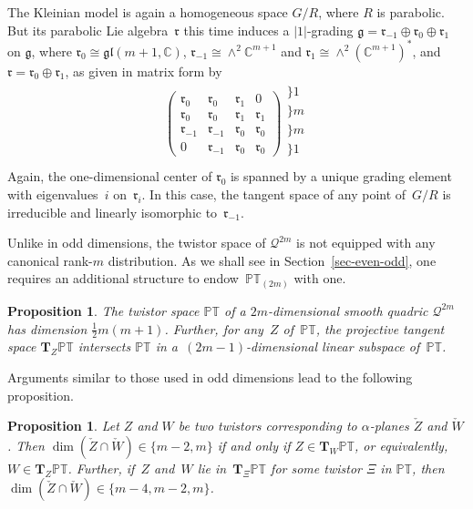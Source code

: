 \documentclass[10pt,a4paper]{amsart}
\numberwithin{equation}{section}
\newtheorem{Proposition}[Theorem]{Proposition}
 { \theoremstyle{definition}
\newtheorem{Definition}[Theorem]{Definition}
\newtheorem{Example}[Theorem]{Example}
\newtheorem{Remark}[Theorem]{Remark} }
\newcommand{\mbf} [1]{\mathbf{#1}}
\newcommand{\mc} [1]{\mathcal{#1}}
\newcommand{\glie} {\mathfrak{gl}}
\newcommand{\g} {\mathfrak{g}}
\newcommand{\mfr} {\mathfrak{r}}
\newcommand{\PT} {\mathbb{PT}}
\newcommand{\C} {\mathbb{C}}
\begin{document}
The Kleinian model is again a homogeneous space $G/R$, where $R$ is parabolic. But its parabolic Lie algebra~$\mfr$ this time induces a $|1|$-grading $\g = \mfr_{-1} \oplus \mfr_0 \oplus \mfr_1$ on $\g$, where $\mfr_0 \cong \glie(m+1,\C)$, $\mfr_{-1} \cong \wedge^2 \C^{m+1}$ and $\mfr_1 \cong \wedge^2 (\C^{m+1})^*$, and $\mfr = \mfr_0 \oplus \mfr_1$, as given in matrix form by
\begin{gather*}
\left(
 \begin{array}{c|c|c|c}
\mfr_0 & \mfr_0 & \mfr_1 & 0 \\\hline 
\mfr_0 & \mfr_0 & \mfr_1 & \mfr_1 \\\hline 
\mfr_{-1} & \mfr_{-1} & \mfr_0 & \mfr_0 \\\hline 
0 & \mfr_{-1} & \mfr_0 & \mfr_0
\end{array} \right)
\begin{array}{l}
\} \scriptscriptstyle{1} \\ \} \scriptscriptstyle{m} \\ \} \scriptscriptstyle{m} \\ \} \scriptscriptstyle{1} \\
\end{array}
\end{gather*}
Again, the one-dimensional center of $\mfr_0$ is spanned by a unique grading element with eigenva\-lues~$i$ on~$\mfr_i$. In this case, the tangent space of any point of~$G/R$ is irreducible and linearly isomorphic to~$\mfr_{-1}$.

Unlike in odd dimensions, the twistor space of $\mc{Q}^{2m}$ is not equipped with any canonical \mbox{rank-$m$} distribution. As we shall see in Section~\ref{sec-even-odd}, one requires an additional structure to endow~$\PT_{(2m)}$ with one.

\begin{Proposition}The twistor space $\PT$ of a $2m$-dimensional smooth quadric $\mc{Q}^{2m}$ has dimension $\frac{1}{2}m(m+1)$. Further, for any~$Z$ of~$\PT$, the projective tangent space $\mbf{T}_Z \PT$ intersects $\PT$ in a~$(2m-1)$-dimensional linear subspace of~$\PT$.
\end{Proposition}

Arguments similar to those used in odd dimensions lead to the following proposition.
\begin{Proposition}Let $Z$ and $W$ be two twistors corresponding to $\alpha$-planes $\check{Z}$ and $\check{W}$. Then $\dim ( \check{Z} \cap \check{W} ) \in \{m-2, m \}$ if and only if $Z \in \mbf{T}_W \PT$, or equivalently, $W \in \mbf{T}_Z \PT$. Further, if~$Z$ and~$W$ lie in~$\mbf{T}_\Xi \PT$ for some twistor $\Xi$ in $\PT$, then $\dim ( \check{Z} \cap \check{W}) \in \{m-4, m-2, m \}$.
\end{Proposition}
\end{document}
